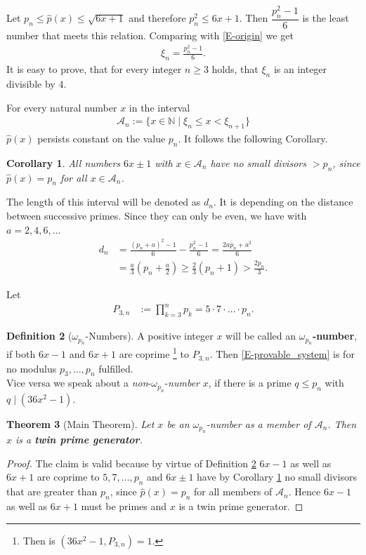 \documentclass[fmeq,reqno]{amsart}
\newtheorem{theorem}{Theorem}[section]
\newtheorem{corollary}[theorem]{Corollary}
\theoremstyle{definition}
\newtheorem{definition}[theorem]{Definition}
\theoremstyle{remark}
\numberwithin{equation}{section}
\newcommand{\N}{\mathbb{N}}
\newcommand{\mc}[1]{\mathcal{#1}}
\newcommand{\prodN}[2]{ \prod_{#1 = 3}^#2}
\newcommand{\om}[1]{$\omega_{#1}$}
\begin{document}
Let $p_n \leq \hat{p}(x) \leq \sqrt{6x+1}$ and therefore $p_n^2 \leq 6x+1$. Then 
$\dfrac{p_n^2-1}{6}$
is the least number that meets this relation. Comparing with \eqref{E-origin} we get
\begin{align}\label{E-origin2}
\xi_n=\frac{p_n^2-1}{6}.
\end{align}
It is easy to prove, that for every integer $n\geq 3$ holds, that $\xi_n$ is an integer divisible by $4$. 

For every natural number $x$ in the interval
\begin{align}\label{E-A-section}
\mc{A}_n := \lbrace x\in\N\mid \xi_n\leq x<\xi_{n+1}\rbrace 
\end{align}
$\hat{p}(x)$ persists constant on the value $p_n$.
It follows the following Corollary. 

\begin{corollary}\label{C-noDivs>pn}
All numbers $6x\pm 1$ with $x\in\mc{A}_n$ have no small divisors $>p_n$, since $\hat{p}(x)=p_n$ for all $x \in \mc{A}_n$.
\end{corollary}

The length of this interval
will be denoted as $d_n$.
It is depending on the distance between successive primes. 
Since they can only be even, we have with $a = 2,4,6, \ldots$
\begin{align}
d_n & = \frac{(p_n+a)^2-1}{6} - \frac{p_n^2-1}{6}
 = \frac{2ap_n+a^2}{6}\nonumber\\
& = \frac{a}{3}(p_n + \frac{a}{2})
 \geq \frac{2}{3}(p_n+1)>\frac{2p_n}{3}.\label{E-dn1}
\end{align}

Let
\begin{align*}
P_{3,n} &:= \prodN{k}{n}p_k = 5\cdot 7\cdot \ldots \cdot p_n.
\end{align*}

\begin{definition}[\om{p_n}-Numbers]\label{D-omega_numbers}
A positive integer $x$ will be called an \textbf{\om{p_n}-number}, if both $6x-1$ and $6x+1$ are coprime
\footnote{
Then is $(36x^2-1, P_{3,n})=1.$
}
to $P_{3,n}$. Then \eqref{E-provable_system} is for no modulus $p_3,\ldots,p_n$ fulfilled.\\
Vice versa we speak about a \textit{non}-\om{p_n}-\textit{number} $x$, if there is a prime $q \leq p_n$ with $q\mid (36x^2-1)$.
\end{definition}

\begin{theorem}[Main Theorem]\label{T-TPGinAsection} 
Let $x$ be an \om{p_n}-number as a member of $\mc{A}_n$. Then $x$ is a \textbf{twin prime generator}.
\end{theorem} 
\begin{proof}
The claim is valid because by virtue of Definition \ref{D-omega_numbers} 
$6x-1$ as well as $6x+1$ are coprime to $5,7,\ldots,p_n$
and $6x\pm 1$ have by Corollary \ref{C-noDivs>pn} no small divisors that are greater than $p_n$, since $\hat{p}(x) = p_n$ for all members of $\mc{A}_n$.
Hence $6x - 1$ as well as $6x + 1$ must be primes and
$x$ is a twin prime generator.
\end{proof}
\medskip
\end{document}
